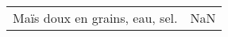 \begin{tabular}{p{7cm}p{7cm}}
                                                                                                                                                                                                                                                                                                                                                                                                                                                                                                                                                                                                                                                                                                                                                                                                                                                                                                                                                                                                                                                                                                                                                                                                                                                                                                                                                                                                                                                                                                                                                                                                                                                                                      Maïs doux en grains, eau, sel. &                                                                                                                                                                                                                                                                                                                                                                                                                                                                                                                                                          NaN \\

\end{tabular}
